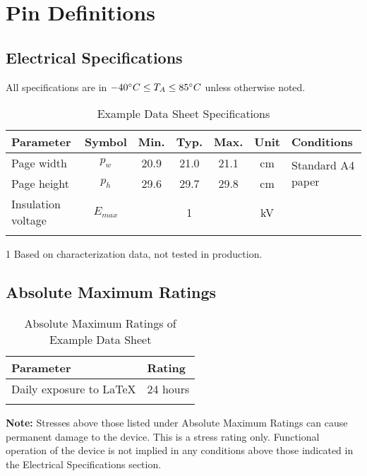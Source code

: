 \documentclass[10pt]{datasheet}
\begin{document}
\section{Pin Definitions}

\subsection{Electrical Specifications}
	All specifications are in $-40\degree C \leq T_A \leq 85\degree C$ unless otherwise noted.
	
	\begin{table}[h]
		\begin{threeparttable}
			\caption{Example Data Sheet Specifications}
			\begin{tabularx}{\textwidth}{l | c | c c c | c | X}
				\thickhline
				\textbf{Parameter} & \textbf{Symbol} & \textbf{Min.} & \textbf{Typ.} & \textbf{Max.} &
				\textbf{Unit} & \textbf{Conditions} \\
				\hline
				Page width  & $p_w$ & 20.9 & 21.0 & 21.1 & cm & \multirow{2}{*}{Standard A4 paper} \\
				Page height & $p_h$ & 29.6 & 29.7 & 29.8 & cm &  \\
				\hline
				Insulation voltage & $E_{max}$\tnote{1} & & 1 & & kV & \\
				\thickhline
			\end{tabularx}
			
			\begin{tablenotes}
				\item[1]{Based on characterization data, not tested in production.}
			\end{tablenotes}
		\end{threeparttable}
	\end{table}

\subsection{Absolute Maximum Ratings}

	\begin{table}[h]
		\caption{Absolute Maximum Ratings of Example Data Sheet}
		\begin{tabularx}{\textwidth}{l | X}
			\thickhline
			\textbf{Parameter} & \textbf{Rating} \hspace{5cm} \\
			\hline
			Daily exposure to LaTeX & 24 hours \\
			\thickhline
		\end{tabularx}
	\end{table}
	
	\textbf{Note:} Stresses above those listed under Absolute Maximum Ratings can
	cause permanent damage to the device. This is a stress rating only. Functional
	operation of the device is not implied in any conditions above those indicated
	in the Electrical Specifications section.
\end{document}

